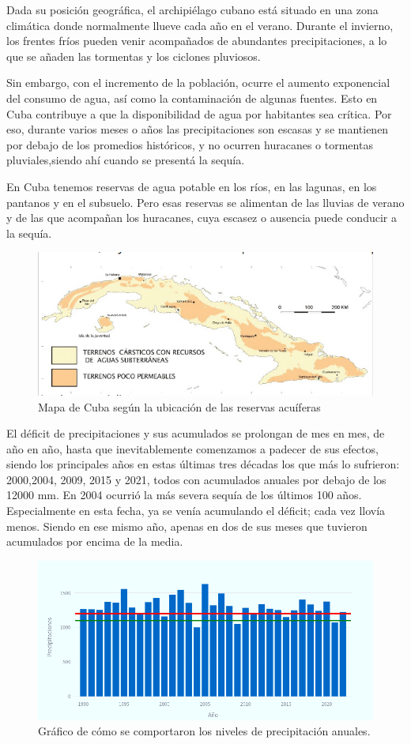 \documentclass[12pt]{article}
\begin{document}
	\newpage
    Dada su posición geográfica, el archipiélago cubano está situado en una zona climática donde normalmente llueve cada año en el verano. Durante el invierno, los frentes fríos pueden venir acompañados de abundantes precipitaciones, a lo que se añaden las tormentas y los ciclones pluviosos.
    \par\vspace{4mm}
    Sin embargo, con el incremento de la población, ocurre el aumento exponencial del consumo de agua, así como la contaminación de algunas fuentes. Esto en Cuba contribuye a que la disponibilidad de agua por habitantes sea crítica. Por eso, durante varios meses o años las precipitaciones son escasas y se mantienen por debajo de los promedios históricos, y no ocurren huracanes o tormentas pluviales,siendo ahí cuando se presentá la sequía.
    \par\vspace{4mm}
    En Cuba tenemos reservas de agua potable en los ríos, en las lagunas, en los pantanos y en el subsuelo. Pero esas reservas se alimentan de las lluvias de verano y de las que acompañan los huracanes, cuya escasez o ausencia puede conducir a la sequía.
    \begin{figure}
		\centering
		\includegraphics[width=0.7\linewidth]{images/10.png}
		\caption{Mapa de Cuba según la ubicación de las reservas acuíferas}
	\end{figure}
	\newpage
    El déficit de precipitaciones y sus acumulados se prolongan de mes en mes, de año en año, hasta que inevitablemente comenzamos a padecer de sus efectos, siendo los principales años en estas últimas tres décadas los que más lo sufrieron:  2000,2004, 2009, 2015 y 2021, todos con acumulados anuales por debajo de los 12000 mm. En 2004 ocurrió la más severa sequía de los últimos 100 años. Especialmente en esta fecha, ya se venía acumulando el déficit; cada vez llovía menos. Siendo en ese mismo año, apenas en dos de sus meses que tuvieron acumulados por encima de la media.
	\par\vspace{2pt}
	\begin{figure}
		\centering
		\includegraphics[width=0.8\linewidth]{images/1.png}
		\caption{Gráfico de cómo se comportaron los niveles de precipitación anuales.}
	\end{figure}
\end{document}
